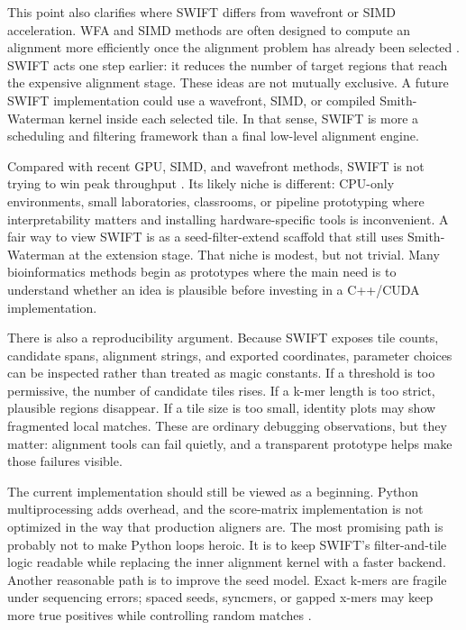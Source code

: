 \documentclass[11pt]{article}
\begin{document}
This point also clarifies where SWIFT differs from wavefront or SIMD acceleration. WFA and SIMD methods are often designed to compute an alignment more efficiently once the alignment problem has already been selected \citep{marcosola2021wfa,liu2023blockaligner}. SWIFT acts one step earlier: it reduces the number of target regions that reach the expensive alignment stage. These ideas are not mutually exclusive. A future SWIFT implementation could use a wavefront, SIMD, or compiled Smith-Waterman kernel inside each selected tile. In that sense, SWIFT is more a scheduling and filtering framework than a final low-level alignment engine.

Compared with recent GPU, SIMD, and wavefront methods, SWIFT is not trying to win peak throughput \citep{schmidt2024cudasw4,liu2023blockaligner,aguadopuig2023wfagpu}. Its likely niche is different: CPU-only environments, small laboratories, classrooms, or pipeline prototyping where interpretability matters and installing hardware-specific tools is inconvenient. A fair way to view SWIFT is as a seed-filter-extend scaffold that still uses Smith-Waterman at the extension stage. That niche is modest, but not trivial. Many bioinformatics methods begin as prototypes where the main need is to understand whether an idea is plausible before investing in a C++/CUDA implementation.

There is also a reproducibility argument. Because SWIFT exposes tile counts, candidate spans, alignment strings, and exported coordinates, parameter choices can be inspected rather than treated as magic constants. If a threshold is too permissive, the number of candidate tiles rises. If a k-mer length is too strict, plausible regions disappear. If a tile size is too small, identity plots may show fragmented local matches. These are ordinary debugging observations, but they matter: alignment tools can fail quietly, and a transparent prototype helps make those failures visible.

The current implementation should still be viewed as a beginning. Python multiprocessing adds overhead, and the score-matrix implementation is not optimized in the way that production aligners are. The most promising path is probably not to make Python loops heroic. It is to keep SWIFT's filter-and-tile logic readable while replacing the inner alignment kernel with a faster backend. Another reasonable path is to improve the seed model. Exact k-mers are fragile under sequencing errors; spaced seeds, syncmers, or gapped x-mers may keep more true positives while controlling random matches \citep{gaston2025xmapper,hoang2024masked_minimizer,shaw2022local_kmer_selection}.
\end{document}
